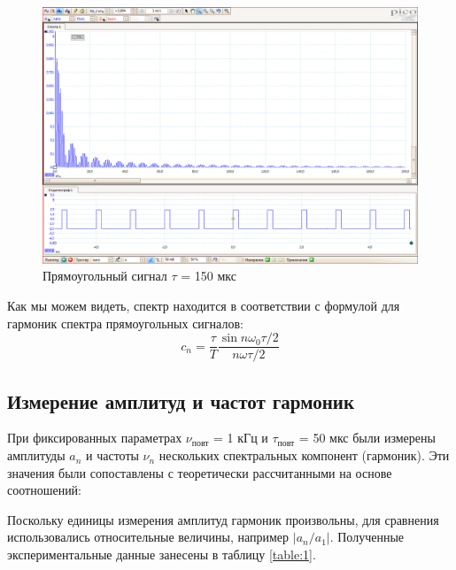 \documentclass[a4paper]{article}
\begin{document}
\begin{figure}[h!]
    \centering
    \includegraphics[width=0.5\pdfpagewidth]{Прямоугольный сигнал 1кГц 150 мкс.PNG}
    \caption{Прямоугольный сигнал $\tau$ = 150 мкс}
\end{figure}

\clearpage
\newpage

Как мы можем видеть, спектр находится в соответствии с формулой для гармоник
спектра прямоугольных сигналов:
\begin{equation}
    c_n = \frac {\tau}{T} \frac{\sin{n\omega_0 \tau / 2}}{n \omega \tau / 2}
\end{equation}

\subsection{Измерение амплитуд и частот гармоник}

При фиксированных параметрах $\nu_\text{повт}$ = 1 кГц и $\tau_\text{повт}$ = 50 мкс были измерены
амплитуды $a_n$ и частоты $\nu_n$ нескольких спектральных компонент (гармоник).
Эти значения были сопоставлены с теоретически рассчитанными на основе соотношений:

Поскольку единицы измерения амплитуд гармоник произвольны, для сравнения использовались относительные величины, например \( |a_n / a_1| \). Полученные экспериментальные данные занесены в таблицу \ref{table:1}.
\end{document}
